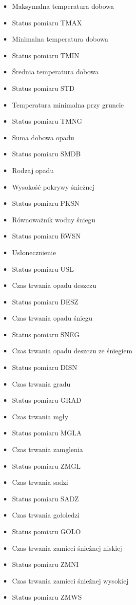 \documentclass[a4paper,12pt,twoside,openany]{report}
\begin{document}
\begin{itemize}
	\item Maksymalna temperatura dobowa
	\item Status pomiaru TMAX
	\item Minimalna temperatura dobowa
	\item Status pomiaru TMIN
	\item Średnia temperatura dobowa
	\item Status pomiaru STD
	\item Temperatura minimalna przy gruncie
	\item Status pomiaru TMNG
	\item Suma dobowa opadu
	\item Status pomiaru SMDB
	\item Rodzaj opadu
	\item Wysokość pokrywy śnieżnej
	\item Status pomiaru PKSN
	\item Równoważnik wodny śniegu
	\item Status pomiaru RWSN
	\item Usłonecznienie
	\item Status pomiaru USL
	\item Czas trwania opadu deszczu
	\item Status pomiaru DESZ
	\item Czas trwania opadu śniegu
	\item Status pomiaru SNEG
	\item Czas trwania opadu deszczu ze śniegiem
	\item Status pomiaru DISN
	\item Czas trwania gradu
	\item Status pomiaru GRAD
	\item Czas trwania mgły
	\item Status pomiaru MGLA
	\item Czas trwania zamglenia
	\item Status pomiaru ZMGL
	\item Czas trwania sadzi
	\item Status pomiaru SADZ
	\item Czas trwania gołoledzi
	\item Status pomiaru GOLO
	\item Czas trwania zamieci śnieżnej niskiej
	\item Status pomiaru ZMNI
	\item Czas trwania zamieci śnieżnej wysokiej
	\item Status pomiaru ZMWS

\end{itemize}
\end{document}
